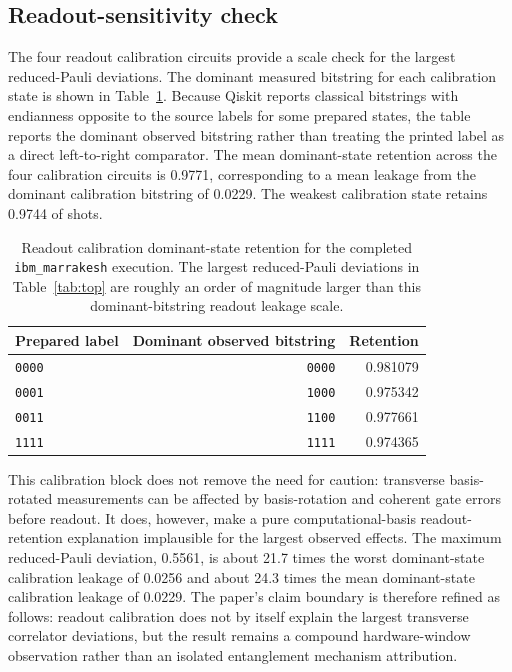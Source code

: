 \documentclass[preprint,aps,physrev,superscriptaddress,floatfix,longbibliography]{revtex4-2}
\begin{document}
\subsection{Readout-sensitivity check}

The four readout calibration circuits provide a scale check for the largest
reduced-Pauli deviations. The dominant measured bitstring for each calibration
state is shown in Table~\ref{tab:readout}. Because Qiskit reports classical
bitstrings with endianness opposite to the source labels for some prepared
states, the table reports the dominant observed bitstring rather than treating
the printed label as a direct left-to-right comparator. The mean dominant-state
retention across the four calibration circuits is 0.9771, corresponding to a
mean leakage from the dominant calibration bitstring of 0.0229. The weakest
calibration state retains 0.9744 of shots.

\begin{table}[tb]
\centering
\small
\begin{tabular}{lrr}
\toprule
Prepared label & Dominant observed bitstring & Retention \\
\midrule
\texttt{0000} & \texttt{0000} & 0.981079 \\
\texttt{0001} & \texttt{1000} & 0.975342 \\
\texttt{0011} & \texttt{1100} & 0.977661 \\
\texttt{1111} & \texttt{1111} & 0.974365 \\
\bottomrule
\end{tabular}
\caption{Readout calibration dominant-state retention for the completed
\texttt{ibm\_marrakesh} execution. The largest reduced-Pauli deviations in
Table~\ref{tab:top} are roughly an order of magnitude larger than this
dominant-bitstring readout leakage scale.}
\label{tab:readout}
\end{table}

This calibration block does not remove the need for caution: transverse
basis-rotated measurements can be affected by basis-rotation and coherent gate
errors before readout. It does, however, make a pure computational-basis
readout-retention explanation implausible for the largest observed effects.
The maximum reduced-Pauli deviation, 0.5561, is about 21.7 times the worst
dominant-state calibration leakage of 0.0256 and about 24.3 times the mean
dominant-state calibration leakage of 0.0229. The paper's claim boundary is
therefore refined as follows: readout calibration does not by itself explain
the largest transverse correlator deviations, but the result remains a
compound hardware-window observation rather than an isolated entanglement
mechanism attribution.
\end{document}
